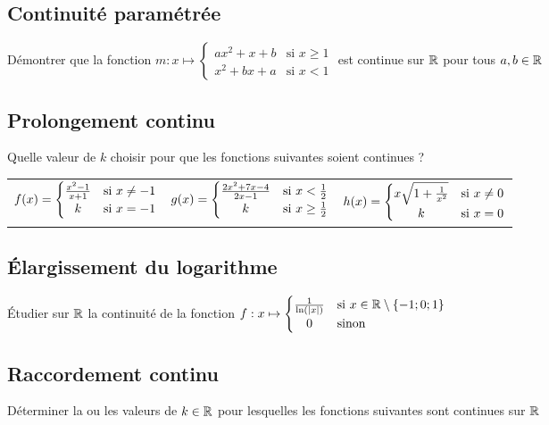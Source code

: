 \documentclass[oneside,12pt]{book}          %
\begin{document}
\subsection{Continuité paramétrée}
Démontrer que la fonction $m:x\mapsto\begin{cases}ax^2+x+b & \text{si } x\geq1\\x^2+bx+a & \text{si } x<1\end{cases}$ est continue sur ${\mathbb R}$ pour tous $a,b\in{\mathbb R}$



\subsection{Prolongement continu}
Quelle valeur de $k$ choisir pour que les fonctions suivantes soient continues ?

\begin{tabular}{p{} p{} p{}}
    $f(x)=\begin{cases}
    		\frac{x^2-1}{x+1} & \text{si } x\neq-1 \\ 
    		\hfil k & \text{si } x=-1
    		\end{cases}$
    &
    $g(x)=\begin{cases}
    		\frac{2x^2+7x-4}{2x-1} & \text{si } x<\frac{1}{2} \\
    		\hfil k & \text{si } x\geq\frac{1}{2}
    		\end{cases}$
    &
    $h(x)=\begin{cases}
    		x\sqrt{1+\frac{1}{x^2}} & \text{si }x\neq0 \\
    		\hfil k & \text{si } x=0
    		\end{cases}$
\end{tabular}



\subsection{Élargissement du logarithme}
Étudier sur ${\mathbb R}$ la continuité de la fonction $f:x\mapsto\begin{cases}\frac{1}{\ln(\abs{x})}&  \text{si } \xR\setminus\{-1;0;1\} \\ \hfil 0  &\text{sinon}\end{cases}$



\subsection{Raccordement continu}
Déterminer la ou les valeurs de $k\in{\mathbb R}$ pour lesquelles les fonctions suivantes sont continues sur ${\mathbb R}$\\
\end{document}
